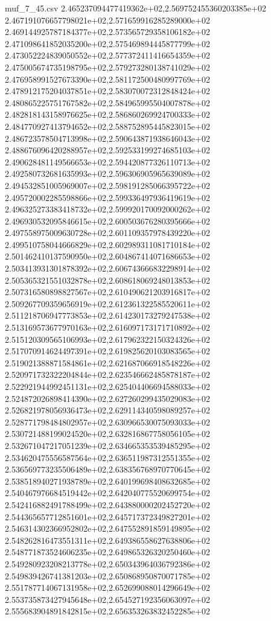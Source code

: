 \begin{filecontents*}{muf_7_45.csv}
2.465237094477419362e+02,2.569752455360203385e+02
2.467191076657798021e+02,2.571659916285289000e+02
2.469144925787184377e+02,2.573565729358106182e+02
2.471098641852035200e+02,2.575469894445877799e+02
2.473052224839050552e+02,2.577372411416654359e+02
2.475005674735198795e+02,2.579273280138741029e+02
2.476958991527673390e+02,2.581172500480997769e+02
2.478912175204037851e+02,2.583070072312848424e+02
2.480865225751767582e+02,2.584965995504007878e+02
2.482818143158976625e+02,2.586860269924700333e+02
2.484770927413794652e+02,2.588752895445823015e+02
2.486723578504713998e+02,2.590643871938646043e+02
2.488676096420288957e+02,2.592533199274685103e+02
2.490628481149566653e+02,2.594420877326110713e+02
2.492580732681635993e+02,2.596306905965639089e+02
2.494532851005969007e+02,2.598191285066395722e+02
2.495720002285598866e+02,2.599336497936419619e+02
2.496325273383418732e+02,2.599920170092000262e+02
2.496930532095846615e+02,2.600503676280395666e+02
2.497558975009630728e+02,2.601109357978439220e+02
2.499510758044666829e+02,2.602989311081710184e+02
2.501462410137590950e+02,2.604867414071686653e+02
2.503413931301878392e+02,2.606743666832298914e+02
2.505365321551032878e+02,2.608618069248013853e+02
2.507316580898827567e+02,2.610490621203916817e+02
2.509267709359656919e+02,2.612361322585520611e+02
2.511218706947773853e+02,2.614230173279247538e+02
2.513169573677970163e+02,2.616097173171710892e+02
2.515120309565106993e+02,2.617962322150324326e+02
2.517070914624497391e+02,2.619825620103083565e+02
2.519021388871584861e+02,2.621687066918548226e+02
2.520971732322204844e+02,2.623546662485878187e+02
2.522921944992451131e+02,2.625404406694588033e+02
2.524872026898414390e+02,2.627260299435029083e+02
2.526821978056936473e+02,2.629114340598089257e+02
2.528771798484802957e+02,2.630966530075093033e+02
2.530721488199024520e+02,2.632816867758056105e+02
2.532671047217051239e+02,2.634665353539485295e+02
2.534620475556587564e+02,2.636511987312551355e+02
2.536569773235506489e+02,2.638356768970770645e+02
2.538518940271938789e+02,2.640199698408632685e+02
2.540467976684519442e+02,2.642040775520699754e+02
2.542416882491788499e+02,2.643880000202452720e+02
2.544365657712851601e+02,2.645717372349827201e+02
2.546314302366952802e+02,2.647552891859149895e+02
2.548262816473551311e+02,2.649386558627638806e+02
2.548771873524606235e+02,2.649865326320250460e+02
2.549280923208213778e+02,2.650343964036792386e+02
2.549839426741381203e+02,2.650868950870071785e+02
2.551787714067131958e+02,2.652699088014296649e+02
2.553735873427945648e+02,2.654527192356063097e+02
2.555683904891842815e+02,2.656353263832452285e+02

\end{filecontents*}
